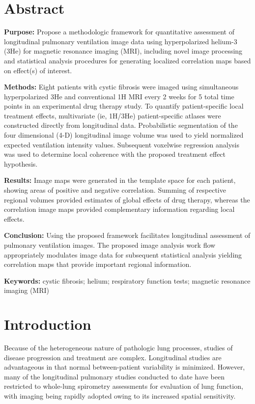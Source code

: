 \documentclass[11pt,]{article}
\begin{document}
\clearpage

\section{Abstract}\label{abstract}

\textbf{Purpose:} Propose a methodologic framework for quantitative
assessment of longitudinal pulmonary ventilation image data using
hyperpolarized helium-3 (3He) for magnetic resonance imaging (MRI),
including novel image processing and statistical analysis procedures for
generating localized correlation maps based on effect(s) of interest.

\textbf{Methods:} Eight patients with cystic fibrosis were imaged using
simultaneous hyperpolarized 3He and conventional 1H MRI every 2 weeks
for 5 total time points in an experimental drug therapy study. To
quantify patient-specific local treatment effects, multivariate (ie,
1H/3He) patient-specific atlases were constructed directly from
longitudinal data. Probabilistic segmentation of the four dimensional
(4-D) longitudinal image volume was used to yield normalized expected
ventilation intensity values. Subsequent voxelwise regression analysis
was used to determine local coherence with the proposed treatment effect
hypothesis.

\textbf{Results:} Image maps were generated in the template space for
each patient, showing areas of positive and negative correlation.
Summing of respective regional volumes provided estimates of global
effects of drug therapy, whereas the correlation image maps provided
complementary information regarding local effects.

\textbf{Conclusion:} Using the proposed framework facilitates
longitudinal assessment of pulmonary ventilation images. The proposed
image analysis work flow appropriately modulates image data for
subsequent statistical analysis yielding correlation maps that provide
important regional information.

\textbf{Keywords:} cystic fibrosis; helium; respiratory function tests;
magnetic resonance imaging (MRI)

\clearpage

\section{Introduction}\label{introduction}

Because of the heterogeneous nature of pathologic lung processes,
studies of disease progression and treatment are complex. Longitudinal
studies are advantageous in that normal between-patient variability is
minimized. However, many of the longitudinal pulmonary studies conducted
to date have been restricted to whole-lung spirometry assessments for
evaluation of lung function, with imaging being rapidly adopted owing to
its increased spatial sensitivity.
\end{document}
